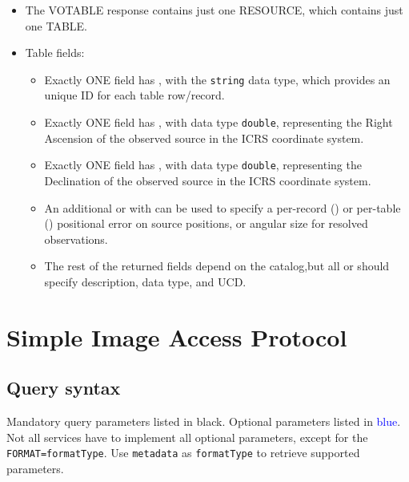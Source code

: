 	\begin{itemize}
		\item The VOTABLE response contains just one RESOURCE, which 
		contains just one TABLE.

		\item Table fields:
		\begin{itemize}
			\item Exactly ONE field has , 
			with the \texttt{string} data type, which provides an 
			unique ID for each table row/record.

			\item Exactly ONE field has 
			,
			with data type \texttt{double}, representing the Right 
			Ascension of the observed source in the ICRS coordinate 
			system.

			\item Exactly ONE field has 
			, with data type 
			\texttt{double}, representing the Declination of the 
			observed source in the ICRS coordinate system.

			\item An additional  or  
			with  can be used to 
			specify a per-record () or per-table 
			() positional error on source positions, 
			or angular size for resolved observations.

			\item The rest of the returned fields depend on the 
			catalog,but all  or  
			should specify description, data type, and UCD.
		\end{itemize}
	\end{itemize}
	
	
	\section{Simple Image Access Protocol} %
	\label{sec:siap}

	\subsection{Query syntax} %
	\label{sub:query_syntax_siap}
	
	Mandatory query parameters listed in black. Optional parameters
	listed in \textcolor{blue}{blue}. Not all services 
	have to
	implement all 
	optional parameters, except for the \texttt{FORMAT=formatType}. Use 
	\texttt{metadata} as \texttt{formatType} to retrieve supported 
	parameters.
	
